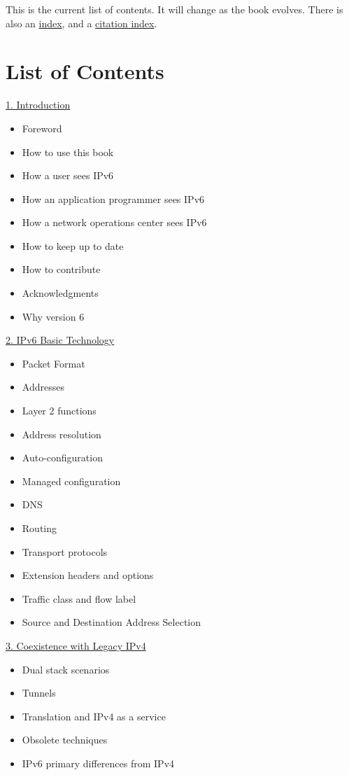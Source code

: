\documentclass[
]{article}
\providecommand{\tightlist}{%
  \setlength{\itemsep}{0pt}\setlength{\parskip}{0pt}}
\begin{document}
This is the current list of contents. It will change as the book
evolves. There is also an \hyperref[book6-main-index]{index}, and a
\hyperref[book6-citation-index]{citation index}.

\section{List of Contents}\label{list-of-contents}

\hyperref[introduction-and-foreword]{1. Introduction}

\begin{itemize}
\tightlist
\item
  Foreword
\item
  How to use this book
\item
  How a user sees IPv6
\item
  How an application programmer sees IPv6
\item
  How a network operations center sees IPv6
\item
  How to keep up to date
\item
  How to contribute
\item
  Acknowledgments
\item
  Why version 6
\end{itemize}

\hyperref[ipv6-basic-technology]{2. IPv6 Basic Technology}

\begin{itemize}
\tightlist
\item
  Packet Format
\item
  Addresses
\item
  Layer 2 functions
\item
  Address resolution
\item
  Auto-configuration
\item
  Managed configuration
\item
  DNS
\item
  Routing
\item
  Transport protocols
\item
  Extension headers and options
\item
  Traffic class and flow label
\item
  Source and Destination Address Selection
\end{itemize}

\hyperref[coexistence-with-legacy-ipv4]{3. Coexistence with Legacy IPv4}

\begin{itemize}
\tightlist
\item
  Dual stack scenarios
\item
  Tunnels
\item
  Translation and IPv4 as a service
\item
  Obsolete techniques
\item
  IPv6 primary differences from IPv4
\end{itemize}
\end{document}
